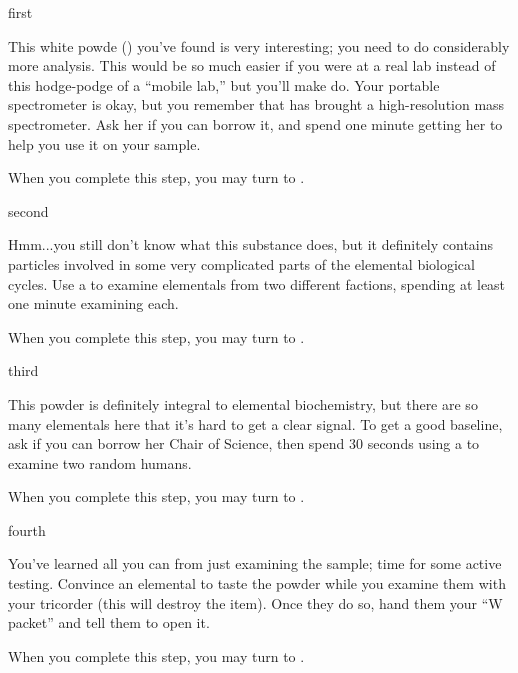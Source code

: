 \documentclass[notebook]{elementals}
\begin{document}

\startnotebook{\nWhiteResearch{}}

\begin{page}{first}

This white powde (\iWhitePowder{}) you've found is very interesting; you need to do considerably more analysis. This would be so much easier if you were at a real lab instead of this hodge-podge of a ``mobile lab,'' but you'll make do. Your portable spectrometer is okay, but you remember that \cGD{} has brought a high-resolution mass spectrometer. Ask her if you can borrow it, and spend one minute getting her to help you use it on your sample.

When you complete this step, you may turn to .

\end{page}

\begin{page}{second}

Hmm...you still don't know what this substance does, but it definitely contains particles involved in some very complicated parts of the elemental biological cycles. Use a \iTricorder{} to examine elementals from two different factions, spending at least one minute examining each.

When you complete this step, you may turn to .

\end{page}

\begin{page}{third}

This powder is definitely integral to elemental biochemistry, but there are so many elementals here that it's hard to get a clear signal. To get a good baseline, ask \cGD{} if you can borrow her Chair of Science, then spend 30 seconds using a \iTricorder{} to examine two random humans.

When you complete this step, you may turn to .

\end{page}

\begin{page}{fourth}

You've learned all you can from just examining the sample; time for some active testing. Convince an elemental to taste the powder while you examine them with your tricorder (this will destroy the item). Once they do so, hand them your ``W packet'' and tell them to open it.

When you complete this step, you may turn to .

\end{page}
\end{document}
